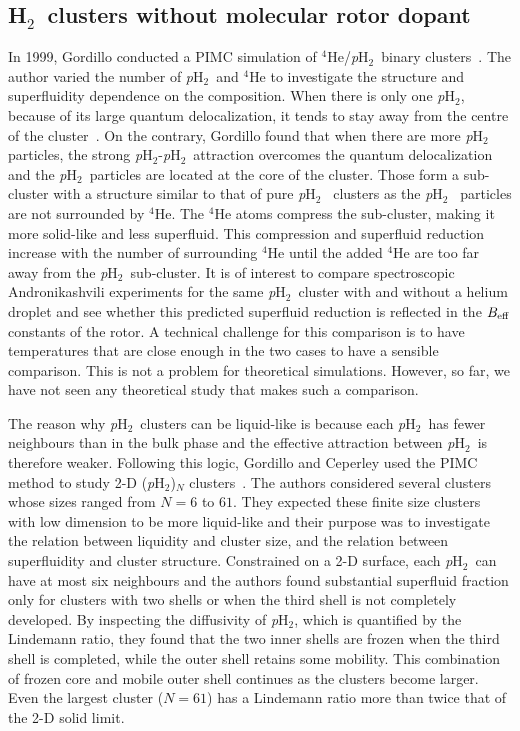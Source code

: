 \documentclass[12pt]{iopart}
\newcommand{\hydrogen}{H$_2$}
\newcommand{\phtwo}{{\em p}H$_2$}
\begin{document}
\subsection{\hydrogen~clusters without molecular rotor dopant} \label{subsec:h2_nodopant}

In 1999, Gordillo conducted a PIMC simulation of  $^4$He/\phtwo~binary clusters~\cite{gordillo_4He/H2}. 
The author varied the number of \phtwo~and $^4$He to investigate the structure and superfluidity dependence on the composition. 
When there is only one \phtwo, because of its large quantum delocalization, it tends to stay away from the centre of the cluster~\cite{whaley_1h2inhe}. 
On the contrary, Gordillo found that when there are more \phtwo particles, the strong \phtwo-\phtwo~attraction overcomes the quantum delocalization and the \phtwo~particles are located  at the core of the cluster. 
Those form a sub-cluster with a structure similar to that of pure \phtwo~ clusters as the \phtwo ~ particles are not surrounded by $^4$He.  
The $^4$He atoms compress the sub-cluster, making it more solid-like and less superfluid. 
This compression and superfluid reduction increase with the number of surrounding $^4$He until the added $^4$He are too far away from the \phtwo~sub-cluster. 
It is of interest to compare spectroscopic Andronikashvili experiments for the same \phtwo~cluster with and without a helium droplet and see whether this predicted superfluid reduction is reflected in the $B_{\rm eff}$ constants of the rotor. 
A technical challenge for this comparison is to have temperatures that are close enough in the two cases  to have a sensible comparison. This is not a problem for theoretical simulations. However, so far, we have not seen any theoretical study that makes such a comparison.

The reason why \phtwo~clusters can be liquid-like is because each \phtwo~has fewer neighbours than in the bulk phase and the effective attraction between \phtwo~is therefore weaker. 
Following this logic, Gordillo and Ceperley used the PIMC method to study 2-D (\phtwo)$_N$ clusters~\cite{gordillo_2d_ph2_cluster}. 
The authors considered several clusters whose sizes ranged from $N=6$ to $61$. They expected these finite size clusters with low dimension to be more liquid-like and their purpose was to investigate the relation between liquidity and cluster size, and the relation between superfluidity and cluster structure. 
Constrained on a 2-D surface, each \phtwo~can have at most six neighbours and the authors found substantial superfluid fraction only for clusters with two shells or when the third shell is not completely developed. 
By inspecting the diffusivity of \phtwo, which is quantified by the Lindemann ratio, 
they found that the two inner shells are frozen when the third shell is completed, while the outer shell retains some mobility. 
This combination of frozen core and mobile outer shell continues as the clusters become larger. Even the largest cluster ($N=61$) has a Lindemann ratio more than twice  that of the 2-D solid limit.
\end{document}
